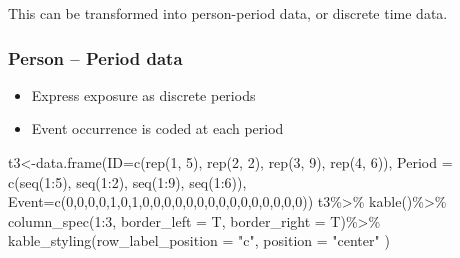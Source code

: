 \documentclass[
]{article}
\newenvironment{Shaded}{\begin{snugshade}}{\end{snugshade}}
\newcommand{\AttributeTok}[1]{\textcolor[rgb]{0.77,0.63,0.00}{#1}}
\newcommand{\DecValTok}[1]{\textcolor[rgb]{0.00,0.00,0.81}{#1}}
\newcommand{\FunctionTok}[1]{\textcolor[rgb]{0.00,0.00,0.00}{#1}}
\newcommand{\NormalTok}[1]{#1}
\newcommand{\OtherTok}[1]{\textcolor[rgb]{0.56,0.35,0.01}{#1}}
\newcommand{\SpecialCharTok}[1]{\textcolor[rgb]{0.00,0.00,0.00}{#1}}
\newcommand{\StringTok}[1]{\textcolor[rgb]{0.31,0.60,0.02}{#1}}
\providecommand{\tightlist}{%
  \setlength{\itemsep}{0pt}\setlength{\parskip}{0pt}}
\begin{document}
This can be transformed into person-period data, or discrete time data.

\hypertarget{person-period-data}{%
\subsubsection{Person -- Period data}\label{person-period-data}}

\begin{itemize}
\tightlist
\item
  Express exposure as discrete periods
\item
  Event occurrence is coded at each period
\end{itemize}

\begin{Shaded}
\begin{Highlighting}[]
\NormalTok{t3}\OtherTok{\textless{}{-}}\FunctionTok{data.frame}\NormalTok{(}\AttributeTok{ID=}\FunctionTok{c}\NormalTok{(}\FunctionTok{rep}\NormalTok{(}\DecValTok{1}\NormalTok{, }\DecValTok{5}\NormalTok{), }\FunctionTok{rep}\NormalTok{(}\DecValTok{2}\NormalTok{, }\DecValTok{2}\NormalTok{), }\FunctionTok{rep}\NormalTok{(}\DecValTok{3}\NormalTok{, }\DecValTok{9}\NormalTok{), }\FunctionTok{rep}\NormalTok{(}\DecValTok{4}\NormalTok{, }\DecValTok{6}\NormalTok{)),}
                    \AttributeTok{Period =} \FunctionTok{c}\NormalTok{(}\FunctionTok{seq}\NormalTok{(}\DecValTok{1}\SpecialCharTok{:}\DecValTok{5}\NormalTok{), }\FunctionTok{seq}\NormalTok{(}\DecValTok{1}\SpecialCharTok{:}\DecValTok{2}\NormalTok{), }\FunctionTok{seq}\NormalTok{(}\DecValTok{1}\SpecialCharTok{:}\DecValTok{9}\NormalTok{), }\FunctionTok{seq}\NormalTok{(}\DecValTok{1}\SpecialCharTok{:}\DecValTok{6}\NormalTok{)),}
                    \AttributeTok{Event=}\FunctionTok{c}\NormalTok{(}\DecValTok{0}\NormalTok{,}\DecValTok{0}\NormalTok{,}\DecValTok{0}\NormalTok{,}\DecValTok{0}\NormalTok{,}\DecValTok{1}\NormalTok{,}\DecValTok{0}\NormalTok{,}\DecValTok{1}\NormalTok{,}\DecValTok{0}\NormalTok{,}\DecValTok{0}\NormalTok{,}\DecValTok{0}\NormalTok{,}\DecValTok{0}\NormalTok{,}\DecValTok{0}\NormalTok{,}\DecValTok{0}\NormalTok{,}\DecValTok{0}\NormalTok{,}\DecValTok{0}\NormalTok{,}\DecValTok{0}\NormalTok{,}\DecValTok{0}\NormalTok{,}\DecValTok{0}\NormalTok{,}\DecValTok{0}\NormalTok{,}\DecValTok{0}\NormalTok{,}\DecValTok{0}\NormalTok{,}\DecValTok{0}\NormalTok{))}
\NormalTok{t3}\SpecialCharTok{\%\textgreater{}\%}
  \FunctionTok{kable}\NormalTok{()}\SpecialCharTok{\%\textgreater{}\%}
  \FunctionTok{column\_spec}\NormalTok{(}\DecValTok{1}\SpecialCharTok{:}\DecValTok{3}\NormalTok{, }\AttributeTok{border\_left =}\NormalTok{ T, }\AttributeTok{border\_right =}\NormalTok{ T)}\SpecialCharTok{\%\textgreater{}\%}
  \FunctionTok{kable\_styling}\NormalTok{(}\AttributeTok{row\_label\_position =} \StringTok{"c"}\NormalTok{, }\AttributeTok{position =} \StringTok{"center"}\NormalTok{ )}
\end{Highlighting}
\end{Shaded}
\end{document}
